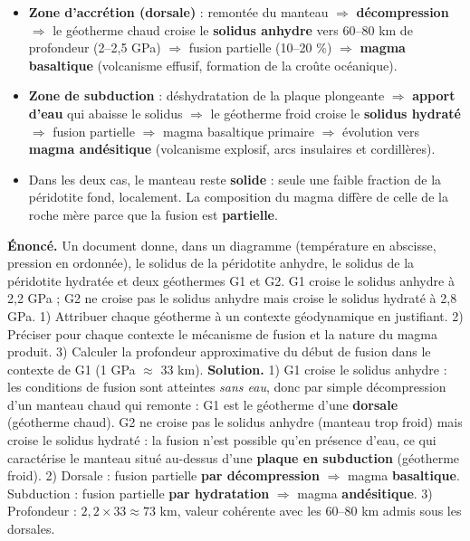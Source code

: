 \documentclass[11pt]{article}
\begin{document}
\begin{aretenir}
\begin{itemize}
\item \textbf{Zone d'accrétion (dorsale)} : remontée du manteau $\Rightarrow$ \textbf{décompression} $\Rightarrow$ le géotherme chaud croise le \textbf{solidus anhydre} vers 60--80 km de profondeur (2--2,5 GPa) $\Rightarrow$ fusion partielle (10--20 \%) $\Rightarrow$ \textbf{magma basaltique} (volcanisme effusif, formation de la croûte océanique).
\item \textbf{Zone de subduction} : déshydratation de la plaque plongeante $\Rightarrow$ \textbf{apport d'eau} qui abaisse le solidus $\Rightarrow$ le géotherme froid croise le \textbf{solidus hydraté} $\Rightarrow$ fusion partielle $\Rightarrow$ magma basaltique primaire $\Rightarrow$ évolution vers \textbf{magma andésitique} (volcanisme explosif, arcs insulaires et cordillères).
\item Dans les deux cas, le manteau reste \textbf{solide} : seule une faible fraction de la péridotite fond, localement. La composition du magma diffère de celle de la roche mère parce que la fusion est \textbf{partielle}.
\end{itemize}
\end{aretenir}

\begin{exoresolu}
\textbf{Énoncé.} Un document donne, dans un diagramme (température en abscisse, pression en ordonnée), le solidus de la péridotite anhydre, le solidus de la péridotite hydratée et deux géothermes G1 et G2. G1 croise le solidus anhydre à 2,2 GPa ; G2 ne croise pas le solidus anhydre mais croise le solidus hydraté à 2,8 GPa. 1) Attribuer chaque géotherme à un contexte géodynamique en justifiant. 2) Préciser pour chaque contexte le mécanisme de fusion et la nature du magma produit. 3) Calculer la profondeur approximative du début de fusion dans le contexte de G1 (1 GPa $\approx$ 33 km).
\tcblower
\textbf{Solution.} 1) G1 croise le solidus anhydre : les conditions de fusion sont atteintes \emph{sans eau}, donc par simple décompression d'un manteau chaud qui remonte : G1 est le géotherme d'une \textbf{dorsale} (géotherme chaud). G2 ne croise pas le solidus anhydre (manteau trop froid) mais croise le solidus hydraté : la fusion n'est possible qu'en présence d'eau, ce qui caractérise le manteau situé au-dessus d'une \textbf{plaque en subduction} (géotherme froid). 2) Dorsale : fusion partielle \textbf{par décompression} $\Rightarrow$ magma \textbf{basaltique}. Subduction : fusion partielle \textbf{par hydratation} $\Rightarrow$ magma \textbf{andésitique}. 3) Profondeur : $2{,}2 \times 33 \approx 73$ km, valeur cohérente avec les 60--80 km admis sous les dorsales.
\end{exoresolu}
\end{document}
